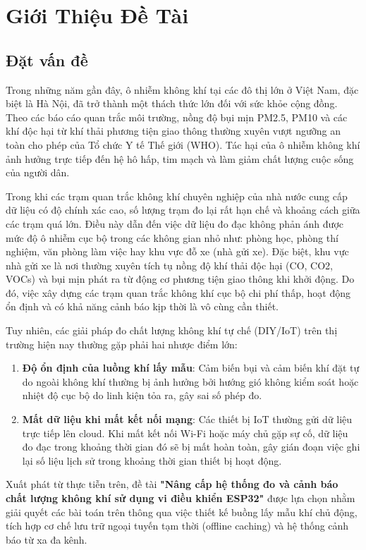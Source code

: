\chapter{Giới Thiệu Đề Tài}

\section{Đặt vấn đề}
Trong những năm gần đây, ô nhiễm không khí tại các đô thị lớn ở Việt Nam, đặc biệt là Hà Nội, đã trở thành một thách thức lớn đối với sức khỏe cộng đồng. Theo các báo cáo quan trắc môi trường, nồng độ bụi mịn PM2.5, PM10 và các khí độc hại từ khí thải phương tiện giao thông thường xuyên vượt ngưỡng an toàn cho phép của Tổ chức Y tế Thế giới (WHO). Tác hại của ô nhiễm không khí ảnh hưởng trực tiếp đến hệ hô hấp, tim mạch và làm giảm chất lượng cuộc sống của người dân.

Trong khi các trạm quan trắc không khí chuyên nghiệp của nhà nước cung cấp dữ liệu có độ chính xác cao, số lượng trạm đo lại rất hạn chế và khoảng cách giữa các trạm quá lớn. Điều này dẫn đến việc dữ liệu đo đạc không phản ánh được mức độ ô nhiễm cục bộ trong các không gian nhỏ như: phòng học, phòng thí nghiệm, văn phòng làm việc hay khu vực đỗ xe (nhà gửi xe). Đặc biệt, khu vực nhà gửi xe là nơi thường xuyên tích tụ nồng độ khí thải độc hại (CO, CO2, VOCs) và bụi mịn phát ra từ động cơ phương tiện giao thông khi khởi động. Do đó, việc xây dựng các trạm quan trắc không khí cục bộ chi phí thấp, hoạt động ổn định và có khả năng cảnh báo kịp thời là vô cùng cần thiết.

Tuy nhiên, các giải pháp đo chất lượng không khí tự chế (DIY/IoT) trên thị trường hiện nay thường gặp phải hai nhược điểm lớn:
\begin{enumerate}
    \item \textbf{Độ ổn định của luồng khí lấy mẫu}: Cảm biến bụi và cảm biến khí đặt tự do ngoài không khí thường bị ảnh hưởng bởi hướng gió không kiểm soát hoặc nhiệt độ cục bộ do linh kiện tỏa ra, gây sai số phép đo.
    \item \textbf{Mất dữ liệu khi mất kết nối mạng}: Các thiết bị IoT thường gửi dữ liệu trực tiếp lên cloud. Khi mất kết nối Wi-Fi hoặc máy chủ gặp sự cố, dữ liệu đo đạc trong khoảng thời gian đó sẽ bị mất hoàn toàn, gây gián đoạn việc ghi lại số liệu lịch sử trong khoảng thời gian thiết bị hoạt động.
\end{enumerate}

Xuất phát từ thực tiễn trên, đề tài \textbf{"Nâng cấp hệ thống đo và cảnh báo chất lượng không khí sử dụng vi điều khiển ESP32"} được lựa chọn nhằm giải quyết các bài toán trên thông qua việc thiết kế buồng lấy mẫu khí chủ động, tích hợp cơ chế lưu trữ ngoại tuyến tạm thời (offline caching) và hệ thống cảnh báo từ xa đa kênh.
\newpage

